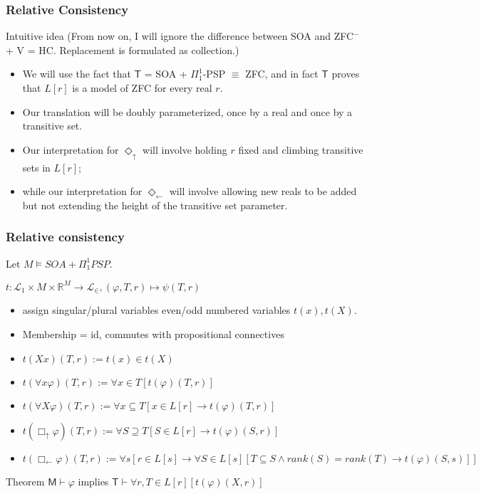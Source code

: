 \documentclass{beamer}
\newcommand{\du}{\Diamond_\uparrow}
\newcommand{\dl}{\Diamond_\leftarrow}
\newcommand{\bu}{\Box_\uparrow}
\newcommand{\bl}{\Box_\leftarrow}
\begin{document}
\begin{frame}
    \frametitle{Relative Consistency}
\begin{block}{Intuitive idea}
     (From now on, I will ignore the difference between SOA 
    and ZFC$^-$+ V = HC. Replacement is formulated as collection.)
    \begin{itemize}
    \item<3-> We will use the fact that $\mathsf{T}$ = SOA + $\Pi_1^1$-PSP 
    $\equiv$ ZFC, and in fact $\mathsf{T}$ proves that $L[r]$ is a 
    model of ZFC for every real $r$. 
    \item<4-> 
    Our translation will be doubly parameterized, once by a real and 
    once by a transitive set.
    \item<5->
    Our interpretation for $\du$ will involve holding $r$ fixed and 
    climbing transitive sets in $L[r]$;
    \item<6-> 
    while our interpretation for $\dl$ will involve allowing new reals 
    to be added but not extending the height of the transitive set parameter.
    \end{itemize}
\end{block}
\end{frame}
\begin{frame}
    \frametitle{Relative consistency}
     Let $M \vDash SOA + \Pi_1^1 PSP$.
    \begin{block}{$t : \mathcal{L}_1 \times M \times \mathbb{R}^M \to \mathcal{L}_\in, (\varphi, T, r) \mapsto \psi(T, r)$}
        \begin{itemize}
            \item<4-> assign singular/plural variables even/odd numbered variables $t(x), t(X)$.
            \item<5-> Membership = id, commutes with propositional connectives 
            \item<6-> $t(Xx)(T, r) := t(x) \in t(X)$
            \item<7-> $t(\forall x \varphi)(T, r) := \forall x \in T [t(\varphi)(T, r)]$
            \item<8-> $t(\forall X \varphi)(T, r) := \forall x \subseteq T [x \in L[r] \rightarrow t(\varphi)(T, r)]$
            \item<9-> $t(\bu \varphi)(T, r) := \forall S \supseteq T [ S \in L[r] \rightarrow t(\varphi)(S, r)]$
            \item<10-> $t(\bl \varphi)(T, r) := \forall s[ r \in L[s] \rightarrow \forall S \in L[s][ T \subseteq S \wedge rank(S) = rank(T) \rightarrow t(\varphi)(S, s)]]$
        \end{itemize}
    \end{block}
\begin{block}{Theorem}
  $\mathsf{M} \vdash \varphi$ implies $\mathsf{T} \vdash \forall r, T \in L[r][t(\varphi)(X, r)]$  
\end{block}
\end{frame}
\end{document}
